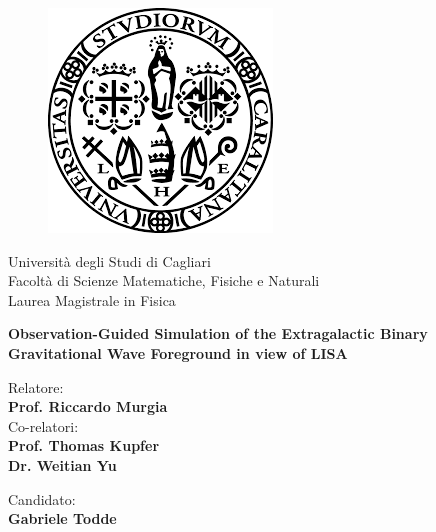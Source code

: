 \begin{titlepage}
\begin{figure}[!htb]
    \centering
    \includegraphics[keepaspectratio=true,scale=0.5]{images/Frontespizio/download.png}
\end{figure}

\begin{center}
    \LARGE{Università degli Studi di Cagliari}
    \vspace{5mm}
    \\ \large{Facoltà di Scienze Matematiche, Fisiche e Naturali}
    \vspace{5mm}
    \\ \LARGE{Laurea Magistrale in Fisica}
\end{center}

\vspace{15mm}
\begin{center}
    {\LARGE{\bf Observation-Guided Simulation of the Extragalactic Binary Gravitational Wave Foreground in view of LISA}}
    
    
\end{center}
\vspace{30mm}

\begin{minipage}[t]{0.47\textwidth}
	{\large{Relatore:}{\normalsize\vspace{3mm}
	\\ 
        \large{\textbf{Prof. Riccardo Murgia}}\vspace{3mm} \\
        {\large{Co-relatori:}{\normalsize\vspace{3mm}
 	\bf\\ 
        \large{Prof. Thomas Kupfer\vspace{1mm}\\
                    Dr. Weitian Yu}
    \normalsize\vspace{3mm}\bf}}}}\\ 
\end{minipage}
\hfill
\begin{minipage}[t]{0.47\textwidth}\raggedleft
	{\large{Candidato:}{\normalsize\vspace{3mm} \bf\\ \large{Gabriele Todde}}}
\end{minipage}

\vspace{30mm}
\hrulefill
\\

\end{titlepage}
